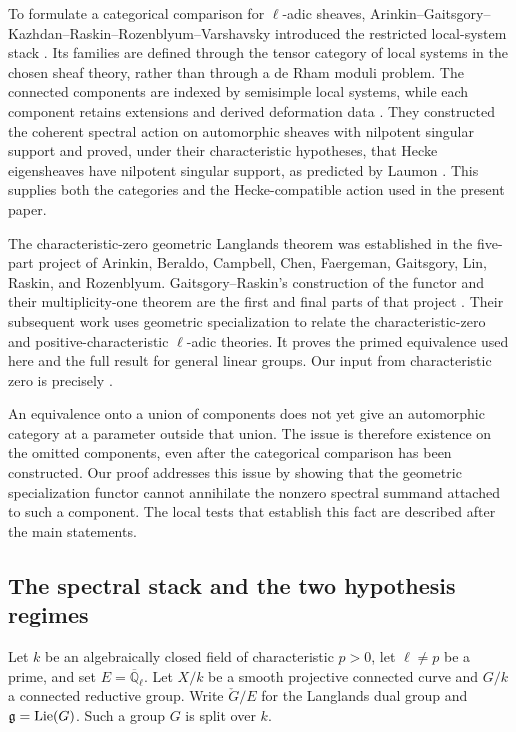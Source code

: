To formulate a categorical comparison for \(\ell\)-adic sheaves,
Arinkin--Gaitsgory--Kazhdan--Raskin--Rozenblyum--Varshavsky introduced
the restricted local-system stack \cite[\S\S0.1--0.2 and \S0.5.4]{AGKRRV}.
Its families are defined through the tensor category of local systems
in the chosen sheaf theory, rather than through a de Rham moduli problem.
The connected components are indexed by semisimple local systems,
while each component retains extensions and derived deformation data
\cite[Proposition~3.7.2 and Corollary~3.7.4]{AGKRRV}.
They constructed the coherent spectral action on automorphic sheaves
with nilpotent singular support and proved, under their characteristic
hypotheses, that Hecke eigensheaves have nilpotent singular support,
as predicted by Laumon
\cite[\S0.2.3 and Theorems~14.3.2 and~14.4.3]{AGKRRV}.
This supplies both the categories and the Hecke-compatible action used
in the present paper.

The characteristic-zero geometric Langlands theorem was established in
the five-part project of Arinkin, Beraldo, Campbell, Chen, Faergeman,
Gaitsgory, Lin, Raskin, and Rozenblyum. Gaitsgory--Raskin's construction
of the functor and their multiplicity-one theorem are the first and
final parts of that project \cite{GLCI,GLCV}.
Their subsequent work \cite{GR} uses geometric specialization to relate
the characteristic-zero and positive-characteristic \(\ell\)-adic theories.
It proves the primed equivalence used here and the full result for
general linear groups. Our input from characteristic zero is precisely
\cite[Main Theorem~1.3.9(ii)]{GR}.

An equivalence onto a union of components does not yet give an
automorphic category at a parameter outside that union. The issue is
therefore existence on the omitted components, even after the
categorical comparison has been constructed. Our proof addresses
this issue by showing that the geometric specialization functor
cannot annihilate the nonzero spectral summand attached to such a
component. The local tests that establish this fact are described
after the main statements.

\subsection{The spectral stack and the two hypothesis regimes}

Let $k$ be an algebraically closed field of characteristic $p>0$, let
$\ell\ne p$ be a prime, and set $E=\overline{\mathbb Q}_\ell$.
Let $X/k$ be a smooth projective connected curve and $G/k$ a connected
reductive group. Write $\check G/E$ for the Langlands dual group and
$\mathfrak g=\operatorname{Lie}(G)$. Such a group $G$ is split over $k$.

